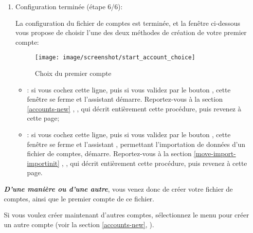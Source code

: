 \begin{enumerate}
	\item Configuration terminée (étape 6/6):\par
	La configuration du fichier de comptes est terminée, et la fenêtre ci-dessous vous propose de choisir l'une des deux méthodes de création de votre premier compte:

\vspace{2mm}

\begin{figure}[htbp]
\begin{center}
\texttt{[image: image/screenshot/start\_account\_choice]}
\end{center}
\caption{Choix du premier compte}
\label{start_account_choice}
\end{figure}

		\begin{itemize}
			\item[\textopenbullet] : si vous cochez cette ligne, puis si vous validez par le bouton , cette fenêtre se ferme et l'assistant  démarre. Reportez-vous à la section \vref{accounts-new}%
			, , qui décrit entièrement cette procédure, puis revenez à cette page;

			\item[\textopenbullet] : si vous cochez cette ligne, puis si vous validez par le bouton , cette fenêtre se ferme et l'assistant , permettant l'importation de données d'un fichier de comptes, démarre. Reportez-vous à la section \vref{move-import-importinit}%
			, , qui décrit entièrement cette procédure, puis revenez à cette page.
		\end{itemize}
\end{enumerate}

\label{start-newfile-end}

\textit{\textbf{D'une manière ou d'une autre}}, vous venez donc de créer votre fichier de comptes, ainsi que le premier compte de ce fichier. 

Si vous voulez créer maintenant d'autres comptes, sélectionnez le menu  pour créer un autre compte (voir la section \vref{accounts-new}, ).

